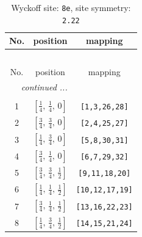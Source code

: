 \documentclass[fleqn,8pt]{jsarticle}
\begin{document}
\renewcommand{\arraystretch}{1.2}
\begin{longtable}{ccc}
\caption{Wyckoff site: {\tt 8e}, site symmetry: {\tt 2.22}}
 \\
 \hline \hline
No. & position & mapping \\ \hline \endfirsthead

\multicolumn{2}{l}{\tablename\ \thetable{}} \\
 \hline \hline
No. & position & mapping \\ \hline \endhead

 \hline \hline
\multicolumn{2}{r}{\footnotesize\it continued ...} \\ \endfoot

 \hline \hline
\multicolumn{2}{r}{} \\ \endlastfoot

1 & $\left[ \frac{1}{4},\, \frac{1}{4},\, 0 \right]$ & {\tt [1,3,26,28]} \\ \hline
2 & $\left[ \frac{3}{4},\, \frac{3}{4},\, 0 \right]$ & {\tt [2,4,25,27]} \\ \hline
3 & $\left[ \frac{1}{4},\, \frac{3}{4},\, 0 \right]$ & {\tt [5,8,30,31]} \\ \hline
4 & $\left[ \frac{3}{4},\, \frac{1}{4},\, 0 \right]$ & {\tt [6,7,29,32]} \\ \hline
5 & $\left[ \frac{3}{4},\, \frac{3}{4},\, \frac{1}{2} \right]$ & {\tt [9,11,18,20]} \\ \hline
6 & $\left[ \frac{1}{4},\, \frac{1}{4},\, \frac{1}{2} \right]$ & {\tt [10,12,17,19]} \\ \hline
7 & $\left[ \frac{3}{4},\, \frac{1}{4},\, \frac{1}{2} \right]$ & {\tt [13,16,22,23]} \\ \hline
8 & $\left[ \frac{1}{4},\, \frac{3}{4},\, \frac{1}{2} \right]$ & {\tt [14,15,21,24]} \\
\end{longtable}
\renewcommand{\arraystretch}{1.2}
\end{document}
